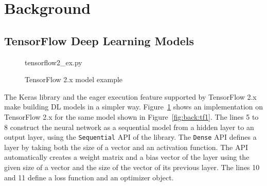 \section{Background}\label{sec:background}

\subsection{TensorFlow Deep Learning Models}


\begin{figure}[ht!]

{tensorflow2_ex.py}
  \caption{TensorFlow 2.x model example}
\label{fig:back:tf2}
\end{figure}

The Keras library and the eager execution feature supported by TensorFlow 2.x
make building DL models in a simpler way.
Figure~\ref{fig:back:tf2} shows an implementation on TensorFlow 2.x for the
same model shown in Figure~\ref{fig:back:tf1}.
The lines 5 to 8 construct the neural network as a sequential model from a
hidden layer to an output layer, using the {\tt Sequential} API of the
library.
The {\tt Dense} API defines a layer by taking both the size of a vector and an
activation function. 
The API automatically creates a weight matrix and a bias vector of the layer
using the given size of a vector and the size of the vector of its previous
layer.
The lines 10 and 11 define a loss function and an optimizer object.  
